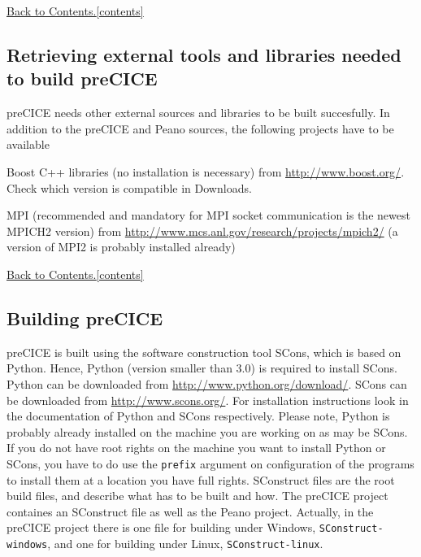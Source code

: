 \documentclass[11pt, oneside]{scrartcl}
\newcommand{\backtocontents}{\hyperref[contents]{Back to Contents.\ref*{contents}}}
\begin{document}
\backtocontents

   
\subsection{Retrieving external tools and libraries needed to build preCICE}
 
preCICE needs other external sources and libraries to be built succesfully. In
addition to the preCICE and Peano sources, the following projects have to be
available
\begin{itemize*}
\item Boost C++ libraries (no installation is necessary) from \url{http://www.boost.org/}. Check which version is compatible in Downloads.
\item MPI (recommended and mandatory for MPI socket communication is the newest
MPICH2 version) from \url{http://www.mcs.anl.gov/research/projects/mpich2/} (a
version of MPI2 is probably installed already)

\end{itemize*}

\backtocontents
  
      
\subsection{Building preCICE}
    
preCICE is built using the software construction tool SCons, which is based on
Python. Hence, Python (version smaller than 3.0) is required to install SCons.
Python can be downloaded from \url{http://www.python.org/download/}. SCons can
be downloaded from \url{http://www.scons.org/}. For installation instructions
look in the documentation of Python and SCons respectively. Please note, Python
is probably already installed on the machine you are working on as may be SCons.
If you do not have root rights on the machine you want to install Python or
SCons, you have to do use the \texttt{prefix} argument on configuration of the
programs to install them at a location you have full rights. SConstruct files
are the root build files, and describe what has to be built and how. The preCICE
project containes an SConstruct file as well as the Peano project. Actually, in
the preCICE project there is one file for building under Windows,
\texttt{SConstruct-windows}, and one for building under Linux,
\texttt{SConstruct-linux}.
\end{document}
